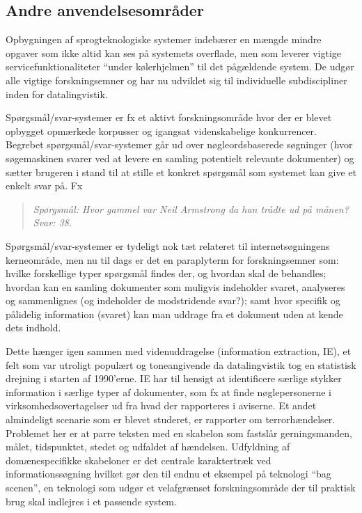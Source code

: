 \documentclass[]{../../metanetpaper}
\begin{document}
\begin{multicols}{2}
\subsection{Andre anvendelsesområder}

 Opbygningen af sprogteknologiske systemer indeb\ae rer en m\ae ngde mindre opgaver som ikke altid kan ses \mbox{p\aa} systemets overflade, men som leverer vigtige servicefunktionaliteter ``under k\o lerhjelmen'' til det p\aa g\ae ldende system. De udg\o r alle vigtige forskningsemner og har nu udviklet sig til individuelle subdiscipliner inden for datalingvistik.


Sp\o rgsm\aa l/svar-systemer er fx et aktivt forskningsomr\aa de hvor der er blevet opbygget opm\ae rkede korpusser og igangsat videnskabelige konkurrencer. Begrebet sp\o rgsm\aa l/svar-systemer g\aa r ud over n\o gleordsbaserede s\o gninger (hvor s\o gemaskinen svarer ved at levere en samling potentielt relevante dokumenter) og s\ae tter brugeren i stand til at stille et konkret sp\o rgsm\aa l som systemet kan give et enkelt svar \mbox{p\aa}. Fx

\begin{quote}
\textit{Sp\o rgsm\aa l: Hvor gammel var Neil Armstrong da han tr\aa dte ud \mbox{p\aa} m\aa nen?}\\
\textit{Svar: 38.}
\end{quote}

Sp\o rgsm\aa l/svar-systemer er tydeligt nok t\ae t relateret til internets\o gningens kerneomr\aa de, men nu til dags er det en paraplyterm for forskningsemner som: hvilke forskellige typer sp\o rgsm\aa l findes der, og hvordan skal de behandles; hvordan kan en samling dokumenter som muligvis indeholder svaret, analyseres og sammenlignes (og indeholder de modstridende svar?); samt hvor specifik og p\aa lidelig information (svaret) kan man uddrage fra et dokument uden at kende dets indhold. 


Dette h\ae nger igen sammen med videnuddragelse (information extraction, IE), et felt som var utroligt popul\ae rt og toneangivende da datalingvistik tog en statistisk drejning i starten af 1990'erne. IE har til hensigt at identificere s\ae rlige stykker information i s\ae rlige typer af dokumenter, som fx at finde n\o glepersonerne i virksomhedsovertagelser ud fra hvad der rapporteres i aviserne. Et andet almindeligt scenarie som er blevet studeret, er rapporter om ter\-ror\-h\ae ndelser. Problemet her er at parre teksten med en skabelon som fastsl\aa r gerningsmanden, m\aa let, tidspunktet, stedet og udfaldet af h\ae ndelsen. Udfyldning af dom\ae nespecifikke skabeloner er det centrale karaktertr\ae k ved informationss\o gning hvilket g\o r den til endnu et eksempel \mbox{p\aa} teknologi ``bag scenen'', en teknologi som udg\o r et velafgr\ae nset forskningsomr\aa de der til praktisk brug skal indlejres i et passende system. 


\end{multicols}
\end{document}
